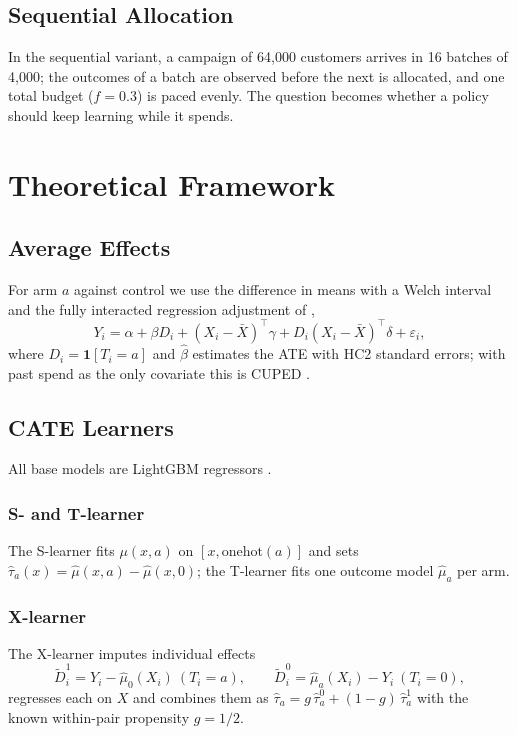 \documentclass[10pt,twocolumn]{article}
\newcommand{\ind}{\mathbf{1}}
\newcommand{\tauh}{\hat{\tau}}
\newcommand{\muh}{\hat{\mu}}
\begin{document}
\subsection{Sequential Allocation}
In the sequential variant, a campaign of 64{,}000 customers arrives in 16 batches of 4{,}000; the
outcomes of a batch are observed before the next is allocated, and one total budget ($f=0.3$) is
paced evenly. The question becomes whether a policy should keep learning while it spends.

\section{Theoretical Framework}
\label{sec:theory}

\subsection{Average Effects}
For arm $a$ against control we use the difference in means with a Welch interval and the fully
interacted regression adjustment of \citet{lin2013},
\begin{equation}
  Y_i = \alpha + \beta D_i + (X_i-\bar X)^{\top}\gamma + D_i (X_i-\bar X)^{\top}\delta + \varepsilon_i,
\end{equation}
where $D_i=\ind[T_i=a]$ and $\hat\beta$ estimates the ATE with HC2 standard errors; with past spend
as the only covariate this is CUPED \citep{deng2013}.

\subsection{CATE Learners}
All base models are LightGBM regressors \citep{ke2017}.

\subsubsection{S- and T-learner}
The S-learner fits $\mu(x,a)$ on $[x,\text{onehot}(a)]$ and sets $\tauh_a(x)=\muh(x,a)-\muh(x,0)$;
the T-learner fits one outcome model $\muh_a$ per arm.

\subsubsection{X-learner}
The X-learner \citep{kunzel2019} imputes individual effects
\begin{equation}
  \tilde D^{1}_i = Y_i-\muh_0(X_i)\ (T_i=a), \qquad \tilde D^{0}_i = \muh_a(X_i)-Y_i\ (T_i=0),
\end{equation}
regresses each on $X$ and combines them as $\tauh_a = g\,\tauh^0_a + (1-g)\,\tauh^1_a$ with the known
within-pair propensity $g=1/2$.
\end{document}
